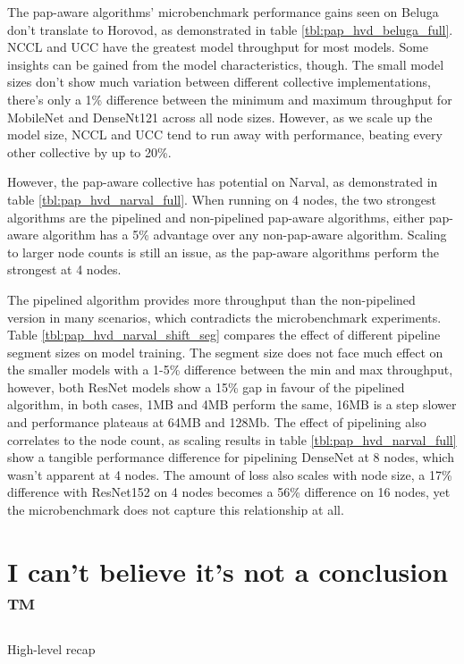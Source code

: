 

The pap-aware algorithms' microbenchmark performance gains seen on Beluga don't translate to Horovod, as demonstrated in table \ref{tbl:pap_hvd_beluga_full}.
NCCL and UCC have the greatest model throughput for most models.
Some insights can be gained from the model characteristics, though.
The small model sizes don't show much variation between different collective implementations, there's only a 1\% difference between the minimum and maximum throughput for MobileNet and DenseNt121 across all node sizes. 
However, as we scale up the model size, NCCL and UCC tend to run away with performance, beating every other collective by up to 20\%.




However, the pap-aware collective has potential on Narval, as demonstrated in table \ref{tbl:pap_hvd_narval_full}.
When running on 4 nodes, the two strongest algorithms are the pipelined and non-pipelined pap-aware algorithms, either pap-aware algorithm has a 5\% advantage over any non-pap-aware algorithm.
Scaling to larger node counts is still an issue, as the pap-aware algorithms perform the strongest at 4 nodes.

The pipelined algorithm provides more throughput than the non-pipelined version in many scenarios, which contradicts the microbenchmark experiments.
Table \ref{tbl:pap_hvd_narval_shift_seg} compares the effect of different pipeline segment sizes on model training.
The segment size does not face much effect on the smaller models with a 1-5\% difference between the min and max throughput, however, both ResNet models show a 15\% gap in favour of the pipelined algorithm, in both cases, 1MB and 4MB perform the same, 16MB is a step slower and performance plateaus at 64MB and 128Mb.
The effect of pipelining also correlates to the node count, as scaling results in table \ref{tbl:pap_hvd_narval_full} show a tangible performance difference for pipelining DenseNet at 8 nodes, which wasn't apparent at 4 nodes.
The amount of loss also scales with node size, a 17\% difference with ResNet152 on 4 nodes becomes a 56\% difference on 16 nodes, yet the microbenchmark does not capture this relationship at all.

\section{I can't believe it's not a conclusion ™}
High-level recap

